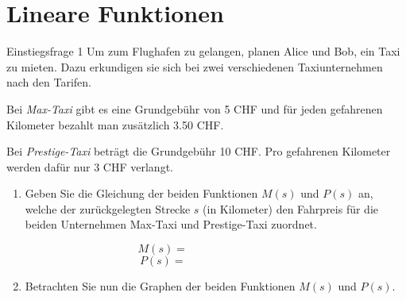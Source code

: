 \section{Lineare Funktionen}
\begin{LA}
    {Einstiegsfrage 1}{}
    Um zum Flughafen zu gelangen, planen Alice und Bob, ein Taxi zu mieten.
    Dazu erkundigen sie sich bei zwei verschiedenen Taxiunternehmen
    nach den Tarifen.

    Bei \emph{Max-Taxi} gibt es eine Grundgebühr von 5 CHF und für jeden
    gefahrenen Kilometer bezahlt man zusätzlich 3.50 CHF.

    Bei \emph{Prestige-Taxi} beträgt die Grundgebühr 10 CHF.
    Pro gefahrenen Kilometer werden dafür nur 3 CHF verlangt.

    \begin{enumerate}
        \item Geben Sie die Gleichung der beiden Funktionen
              \(M(s)\) und \(P(s)\) an, welche der zurückgelegten
              Strecke \(s\) (in Kilometer) den Fahrpreis für die beiden
              Unternehmen Max-Taxi und Prestige-Taxi zuordnet.

              \[
                  M(s)=\hspace{4cm}
              \]
              \[
                  P(s)=\hspace{4cm}
              \]

        \item Betrachten Sie nun die Graphen der beiden Funktionen
              \(M(s)\) und \(P(s)\).

              \begin{center}
\end{center}
\end{enumerate}
\end{LA}
